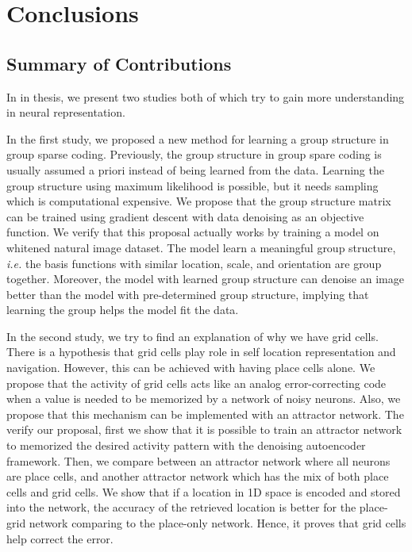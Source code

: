\chapter{Conclusions}

\label{chap:conclusion}

\section{Summary of Contributions}

In in thesis, we present two studies both of which try to gain more understanding in neural representation.

In the first study, we proposed a new method for learning a group structure in group sparse coding. Previously, the group structure in group spare coding is usually assumed a priori instead of being learned from the data. Learning the group structure using maximum likelihood is possible, but it needs sampling which is computational expensive. We propose that the group structure matrix can be trained using gradient descent with data denoising as an objective function. We verify that this proposal actually works by training a model on whitened natural image dataset. The model learn a meaningful group structure, \textit{i.e.} the basis functions with similar location, scale, and orientation are group together. Moreover, the model with learned group structure can denoise an image better than the model with pre-determined group structure, implying that learning the group helps the model fit the data.

In the second study, we try to find an explanation of why we have grid cells. There is a hypothesis that grid cells play role in self location representation and navigation. However,  this can be achieved with having place cells alone. We propose that the activity of grid cells acts like an analog error-correcting code when a value is needed to be memorized by a network of noisy neurons. Also, we propose that this mechanism can be implemented with an attractor network. The verify our proposal, first we show that it is possible to train an attractor network to memorized the desired activity pattern with the denoising autoencoder framework. Then, we compare between an attractor network where all neurons are place cells, and another attractor network which has the mix of both place cells and grid cells. We show that if a location in 1D space is encoded and stored into the network, the accuracy of the retrieved location is better for the place-grid network comparing to the place-only network. Hence, it proves that grid cells help correct the error.

